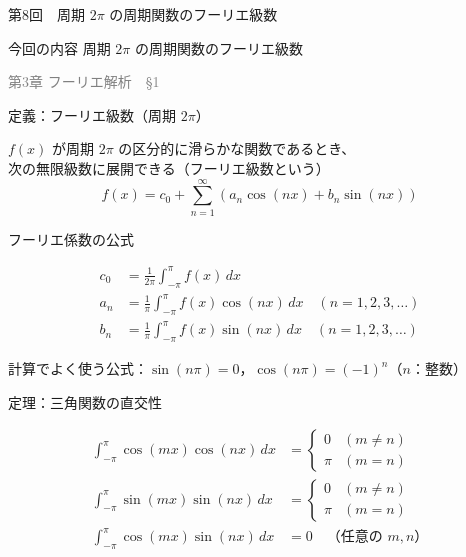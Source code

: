 \documentclass[professionalfonts]{beamer}
\begin{document}
\begin{frame}{第8回　周期 $2\pi$ の周期関数のフーリエ級数}
  \begin{block}{今回の内容}
  周期 $2\pi$ の周期関数のフーリエ級数
  \end{block}
  \vfill\hfill{\scriptsize \textcolor{gray}{第3章 フーリエ解析　§1}}
\end{frame}

\begin{frame}{定義：フーリエ級数（周期 $2\pi$）}
  \begin{block}{}
  $f(x)$ が周期 $2\pi$ の区分的に滑らかな関数であるとき、\\[2pt]
  次の無限級数に展開できる（フーリエ級数という）\\[2pt]
  \[
    f(x) = c_{0} + \sum_{n=1}^\infty (a_{n}\cos(nx) + b_{n}\sin(nx))
  \]
  \end{block}
\end{frame}

\begin{frame}{フーリエ係数の公式}
  \begin{block}{}
  \begin{align*}
    c_{0} &= \frac{1}{2\pi} \int_{-\pi}^{\pi} f(x)\,dx \\[6pt]
    a_{n} &= \frac{1}{\pi} \int_{-\pi}^{\pi} f(x)\cos(nx)\,dx \quad (n = 1, 2, 3, \ldots) \\[6pt]
    b_{n} &= \frac{1}{\pi} \int_{-\pi}^{\pi} f(x)\sin(nx)\,dx \quad (n = 1, 2, 3, \ldots)
  \end{align*}
  \end{block}
  \vfill
  {\small 計算でよく使う公式：$\sin(n\pi) = 0$，\;$\cos(n\pi) = (-1)^{n}$\quad（$n$：整数）}
\end{frame}

\begin{frame}{定理：三角関数の直交性}
  \begin{block}{}
  \begin{align*}
    \int_{-\pi}^{\pi} \cos(mx)\cos(nx)\,dx &= \begin{cases} 0 & (m \neq n) \\ \pi & (m = n) \end{cases} \\
    \int_{-\pi}^{\pi} \sin(mx)\sin(nx)\,dx &= \begin{cases} 0 & (m \neq n) \\ \pi & (m = n) \end{cases} \\
    \int_{-\pi}^{\pi} \cos(mx)\sin(nx)\,dx &= 0 \quad \text{（任意の $m, n$）}
  \end{align*}
  \end{block}
\end{frame}
\end{document}
